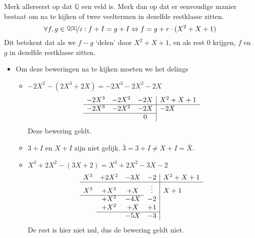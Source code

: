\documentclass[main.tex]{subfiles}
\begin{document}
Merk allereerst op dat $\mathbb{Q}$ een veld is.
Merk dan op dat er eenvoudige manier bestaat om na te kijken of twee veeltermen in dezelfde restklasse zitten.
\[ \forall f,g \in \nicefrac{\mathbb{Q[X]}}{I}: f+I = g+I \Leftrightarrow f=g + r \cdot (X^{2}+X+1) \]
Dit betekent dat als we $f-g$ `delen' door $X^{2}+X+1$, en als rest $0$ krijgen, $f$ en $g$ in dezelfde restklasse zitten.
\begin{itemize}
\item 
  Om deze beweringen na te kijken moeten we het delings
  \begin{itemize}
  \item $-2X^{2} - (2X^{3}+2X) = -2X^{3}-2X^{2}-2X$
    \[
    \begin{array}{ccc|l}
      -2X^{3} & -2X^{2} & -2X & X^{2}+X+1\\ \hline
      -2X^{3} & -2X^{2} & -2X & -2X \\\cline{1-3}
      &        &  0  & \\ 
    \end{array}
    \]
    Deze bewering geldt.
  \item $3+I$ en $X+I$ zijn niet gelijk. $\bar{3} = 3+I \neq X+I = \bar{X}$.
  \item $X^{3}+2X^{2} - (3X+2) = X^{3} +2X^{2}-3X - 2$
    \[
    \begin{array}{cccc|l}
      X^{3} & +2X^{2} & -3X & -2 & X^{2}+X+1\\ \hline
      X^{3} & +X^{2} & + X & \vdots & X +1 \\\cline{1-3}
      & +X^{2} & -4X & -2 & \\
      & +X^{2} & + X & +1 & \\\cline{2-4}
      &       & -5X & -3 
    \end{array}
    \]
    De rest is hier niet nul, dus de bewering geldt niet.


\end{itemize}
\end{itemize}
\end{document}
